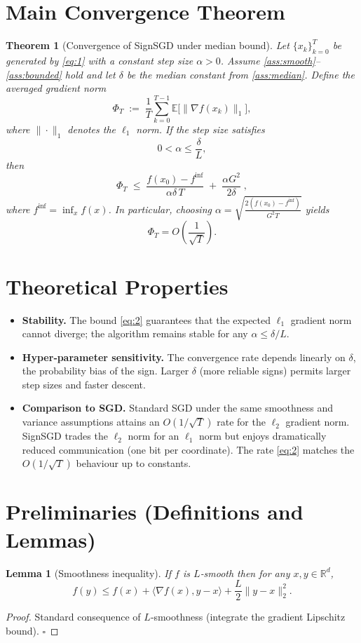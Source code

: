 \documentclass{article}
\newtheorem{theorem}{Theorem}
\newtheorem{lemma}{Lemma}
\newcommand{\E}{\mathbb{E}}
\newcommand{\R}{\mathbb{R}}
\begin{document}
\section*{Main Convergence Theorem}
\begin{theorem}[Convergence of SignSGD under median bound]\label{thm:main}
Let $\{x_k\}_{k=0}^{T}$ be generated by \eqref{eq:1} with a constant step size $\alpha>0$.  
Assume \ref{ass:smooth}–\ref{ass:bounded} hold and let $\delta$ be the median constant from \ref{ass:median}.  
Define the averaged gradient norm
\[
\Phi_T\;:=\;\frac{1}{T}\sum_{k=0}^{T-1}\E\bigl[\|\nabla f(x_k)\|_1\bigr],
\]
where $\|\cdot\|_1$ denotes the $\ell_1$ norm.  
If the step size satisfies
\[
0<\alpha\le \frac{\delta}{L},
\]
then
\begin{equation}
\Phi_T\;\le\;\frac{f(x_0)-f^{\inf}}{\alpha\delta\,T}\;+\;\frac{\alpha G^2}{2\delta}\;,
\tag{2}
\end{equation}
where $f^{\inf}=\inf_{x}f(x)$. In particular, choosing $\alpha=\sqrt{\frac{2(f(x_0)-f^{\inf})}{G^2 T}}$ yields
\[
\Phi_T = O\!\left(\frac{1}{\sqrt{T}}\right).
\]
\end{theorem}

\section*{Theoretical Properties}
\begin{itemize}
\item \textbf{Stability.} The bound \eqref{eq:2} guarantees that the expected $\ell_1$ gradient norm cannot diverge; the algorithm remains stable for any $\alpha\le\delta/L$.
\item \textbf{Hyper‑parameter sensitivity.} The convergence rate depends linearly on $\delta$, the probability bias of the sign. Larger $\delta$ (more reliable signs) permits larger step sizes and faster descent.
\item \textbf{Comparison to SGD.} Standard SGD under the same smoothness and variance assumptions attains an $O(1/\sqrt{T})$ rate for the $\ell_2$ gradient norm. SignSGD trades the $\ell_2$ norm for an $\ell_1$ norm but enjoys dramatically reduced communication (one bit per coordinate). The rate \eqref{eq:2} matches the $O(1/\sqrt{T})$ behaviour up to constants.
\end{itemize}

\newpage
\section*{Preliminaries (Definitions and Lemmas)}
\begin{lemma}[Smoothness inequality]\label{lem:smooth}
If $f$ is $L$‑smooth then for any $x,y\in\R^{d}$,
\[
f(y)\le f(x)+\langle\nabla f(x),y-x\rangle+\frac{L}{2}\|y-x\|_2^2 .
\]
\end{lemma}
\begin{proof}
Standard consequence of $L$‑smoothness (integrate the gradient Lipschitz bound). \hfill $\square$
\end{proof}
\end{document}
